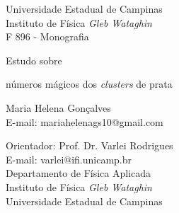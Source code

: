 \pagestyle{plain}
\thispagestyle{empty}
\begin{center}

{\Large \sc
Universidade Estadual de Campinas \\
Instituto de Física {\em Gleb Wataghin} \\
\vspace{0.5cm}
F 896 - Monografia}

\vspace{2cm}

{\huge Estudo sobre

\bigskip

números mágicos dos \textit{clusters} de prata}

\vspace{2.5cm}

\end{center}

\begin{center}

{\large Maria Helena Gonçalves} \\
E-mail: mariahelenags10@gmail.com

\vspace{2.7cm}





{Orientador: Prof. Dr. Varlei Rodrigues}\\
E-mail: varlei@ifi.unicamp.br \\
Departamento de Física Aplicada \\
Instituto de Física {\em Gleb Wataghin}\\
Universidade Estadual de Campinas

\end{center}

\vspace{0.5cm}

\begin{center}

 \\
\noindent {\Large{\today}} \\

\end{center}

\newpage

$ $

\newpage
